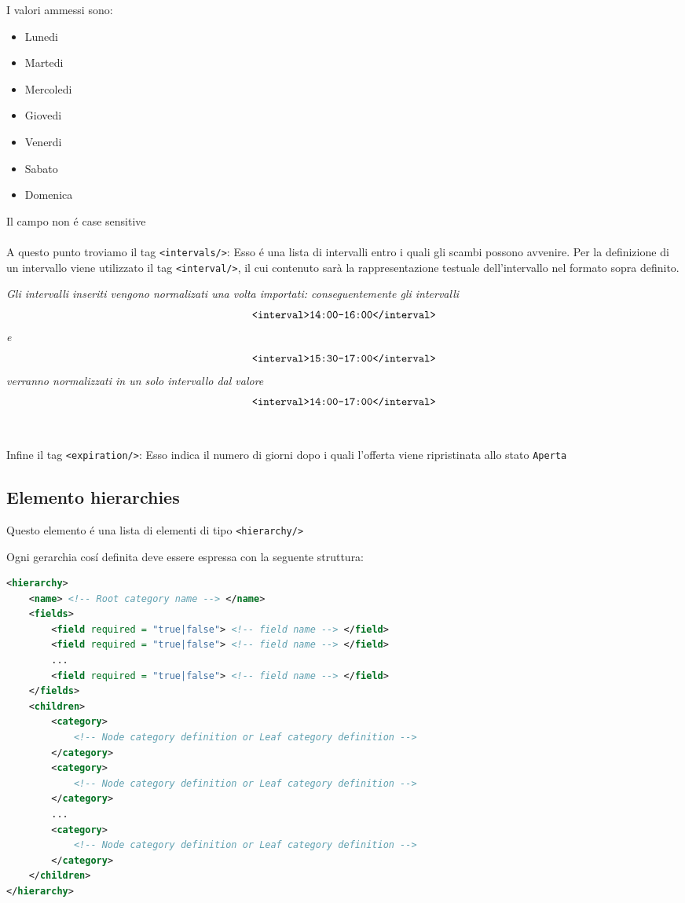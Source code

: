 I valori ammessi sono:
\begin{itemize}
    \item Lunedi
    \item Martedi
    \item Mercoledi
    \item Giovedi
    \item Venerdi
    \item Sabato
    \item Domenica
\end{itemize}
Il campo non é case sensitive
\\\\
A questo punto troviamo il tag \verb|<intervals/>|: Esso é una lista di intervalli entro i quali gli scambi possono avvenire. Per la definizione di un intervallo viene utilizzato il tag \verb|<interval/>|, il cui contenuto sarà la rappresentazione testuale dell'intervallo nel formato sopra definito.

\textit{Gli intervalli inseriti vengono normalizati una volta importati: conseguentemente gli intervalli} \[\verb|<interval>14:00-16:00</interval>|\] \textit{e} \[\verb|<interval>15:30-17:00</interval>|\] \textit{verranno normalizzati in un solo intervallo dal valore} \[\verb|<interval>14:00-17:00</interval>|\]
\\\\
Infine il tag \verb|<expiration/>|: Esso indica il numero di giorni dopo i quali l'offerta viene ripristinata allo stato \texttt{Aperta}

\pagebreak

\subsection{Elemento hierarchies}
Questo elemento é una lista di elementi di tipo \verb|<hierarchy/>|

Ogni gerarchia cosí definita deve essere espressa con la seguente struttura:

\begin{lstlisting}[language=XML]
<hierarchy>
    <name> <!-- Root category name --> </name>
    <fields>
        <field required = "true|false"> <!-- field name --> </field>
        <field required = "true|false"> <!-- field name --> </field>
        ...
        <field required = "true|false"> <!-- field name --> </field>
    </fields>
    <children>
        <category>
            <!-- Node category definition or Leaf category definition -->
        </category>
        <category>
            <!-- Node category definition or Leaf category definition -->
        </category>
        ...
        <category>
            <!-- Node category definition or Leaf category definition -->
        </category>
    </children>
</hierarchy>
\end{lstlisting}

